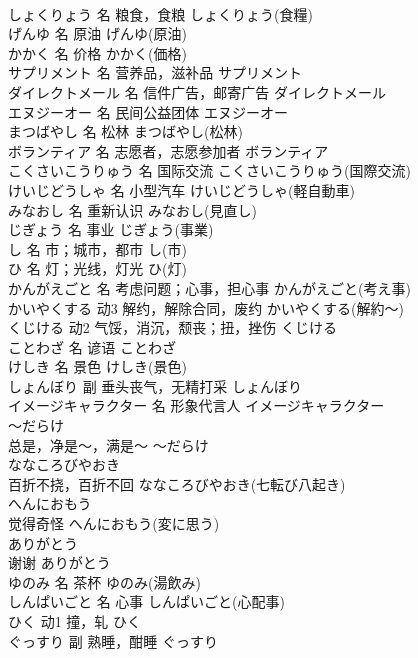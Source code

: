 \documentclass[8pt]{extreport}
\begin{document}
\begin{CJK}{UTF8}{min}
\\	しょくりょう	名	粮食，食粮	しょくりょう(食糧)	
\\	げんゆ	名	原油	げんゆ(原油)	
\\	かかく	名	价格	かかく(価格)	
\\	サプリメント	名	营养品，滋补品	サプリメント	
\\	ダイレクトメール	名	信件广告，邮寄广告	ダイレクトメール	
\\	エヌジーオー	名	民间公益团体	エヌジーオー
\\	まつばやし	名	松林	まつばやし(松林)	
\\	ボランティア	名	志愿者，志愿参加者	ボランティア	
\\	こくさいこうりゅう	名	国际交流	こくさいこうりゅう(国際交流)	
\\	けいじどうしゃ	名	小型汽车	けいじどうしゃ(軽自動車)	
\\	みなおし	名	重新认识	みなおし(見直し)	
\\	じぎょう	名	事业	じぎょう(事業)	
\\	し	名	市；城市，都市	し(市)	
\\	ひ	名	灯；光线，灯光	ひ(灯)	
\\	かんがえごと	名	考虑问题；心事，担心事	かんがえごと(考え事)	
\\	かいやくする	动3	解约，解除合同，废约	かいやくする(解約～)	
\\	くじける	动2	气馁，消沉，颓丧；扭，挫伤	くじける	
\\	ことわざ	名	谚语	ことわざ	
\\	けしき	名	景色	けしき(景色)	
\\	しょんぼり	副	垂头丧气，无精打采	しょんぼり	
\\	イメージキャラクター	名	形象代言人	イメージキャラクター	
\\	～だらけ	
\\	总是，净是～，满是～	～だらけ	
\\	ななころびやおき	
\\	百折不挠，百折不回	ななころびやおき(七転び八起き)	
\\	へんにおもう	
\\	觉得奇怪	へんにおもう(変に思う)	
\\	ありがとう	
\\	谢谢	ありがとう	
\\	ゆのみ	名	茶杯	ゆのみ(湯飲み)	
\\	しんぱいごと	名	心事	しんぱいごと(心配事)	
\\	ひく	动1	撞，轧	ひく	
\\	ぐっすり	副	熟睡，酣睡	ぐっすり	

\end{CJK}
\end{document}
